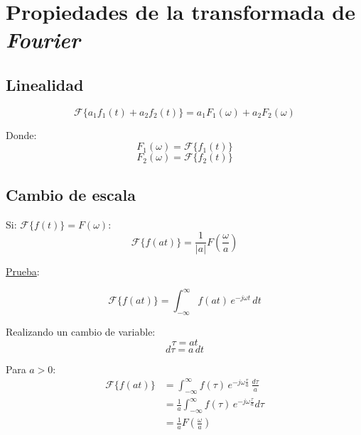 \section{Propiedades de la transformada de \emph{Fourier}}
\subsection{Linealidad}
\begin{equation}
    \mathcal{F}\{a_1f_1(t)+a_2f_2(t)\}=a_1F_1(\omega)+a_2F_2(\omega)
\end{equation}

Donde:
\begin{equation*}
    F_1(\omega)=\mathcal{F}\{f_1(t)\}
\end{equation*}
\begin{equation*}
    F_2(\omega)=\mathcal{F}\{f_2(t)\}
\end{equation*}

\subsection{Cambio de escala}
Si: $\mathcal{F}\{f(t)\}=F(\omega)$:
\begin{equation}
    \mathcal{F}\{f(at)\}=\frac{1}{|a|}F\left(\frac{\omega}{a}\right)
\end{equation}

\underline{Prueba}:

\begin{equation*}
    \mathcal{F}\{f(at)\}=\int_{-\infty}^\infty f(at)\,e^{-j\omega t}\,dt
\end{equation*}

Realizando un cambio de variable:
\begin{equation*}
    \tau=at
\end{equation*}
\begin{equation*}
    d\tau=a\,dt
\end{equation*}

Para $a>0$:
\begin{equation*}
\begin{split}
    \mathcal{F}\{f(at)\}
        &=\int_{-\infty}^\infty f(\tau)\,e^{-j\omega
            \frac{\tau}{a}}\,\frac{d\tau}{a}\\
        &=\frac{1}{a}\int_{-\infty}^\infty f(\tau)\,e^{-j\omega
            \frac{\tau}{a}}d\tau\\
        &=\frac{1}{a}F\left(\frac{\omega}{a}\right)\\
\end{split}
\end{equation*}

